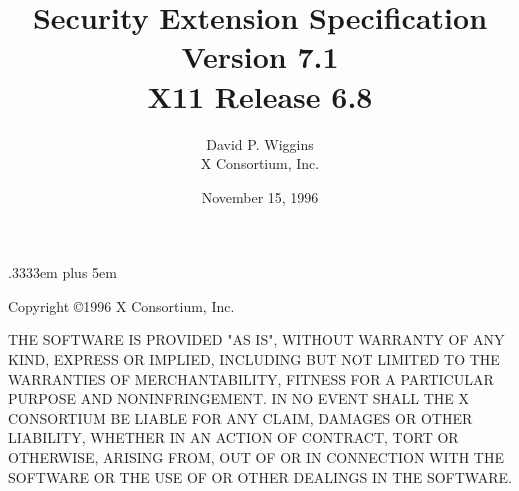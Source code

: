 \newenvironment{eerror}[1]{\begin{keeptogether} \encodingsection{#1} \begin{tabbing} \etabstops }{\end{tabbing} \end{keeptogether}}

\newenvironment{etypedef}[1]{\begin{keeptogether} \typename{#1} \begin{tabbing} \etabstops }{\end{tabbing} \end{keeptogether}}

\newcommand{\cfunctionname}[1]{\mbox{\tt #1}}
\newcommand{\cfunctiondecl}[1]{\mbox{\rm #1}}
\newcommand{\cargdecl}[2]{\penalty -1\typename{#1} \argname{#2}}
\newenvironment{cfunction}[2]{\begin{sloppypar}\begin{keeptogether}\vspace{5mm}\typename{#1}\\ \cfunctiondecl{#2}\ (}{)\end{keeptogether}\end{sloppypar}{\hangafter=2 \hangindent=20pt \raggedright\par}}

\spaceskip .3333em plus 5em



\title{Security Extension Specification\\Version 7.1\\X11 Release 6.8}
\author{David P. Wiggins\\X Consortium, Inc.}
\date{November 15, 1996}
\maketitle
\thispagestyle{empty}

\eject

Copyright \copyright 1996 X Consortium, Inc.

THE SOFTWARE IS PROVIDED "AS IS", WITHOUT WARRANTY OF ANY KIND,
EXPRESS OR IMPLIED, INCLUDING BUT NOT LIMITED TO THE WARRANTIES OF
MERCHANTABILITY, FITNESS FOR A PARTICULAR PURPOSE AND NONINFRINGEMENT.
IN NO EVENT SHALL THE X CONSORTIUM BE LIABLE FOR ANY CLAIM, DAMAGES OR
OTHER LIABILITY, WHETHER IN AN ACTION OF CONTRACT, TORT OR OTHERWISE,
ARISING FROM, OUT OF OR IN CONNECTION WITH THE SOFTWARE OR THE USE OF
OR OTHER DEALINGS IN THE SOFTWARE.

